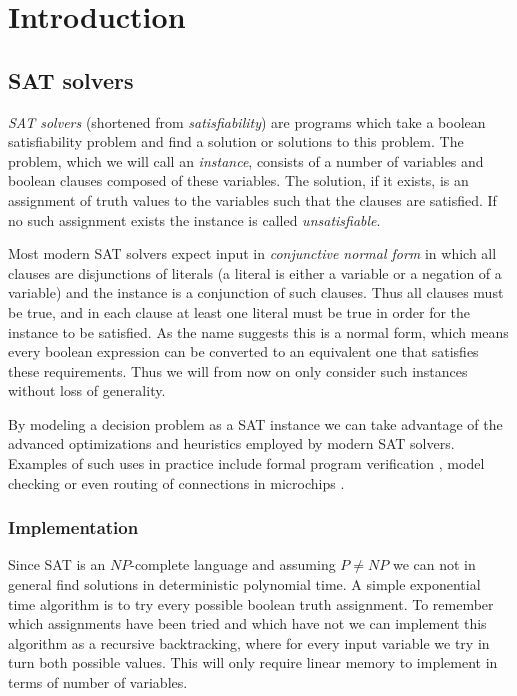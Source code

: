 \chapter{Introduction}
\section{SAT solvers}
\emph{SAT solvers} (shortened from \emph{satisfiability}) are programs which take a boolean satisfiability problem and find a solution or solutions to this problem.
The problem, which we will call an \emph{instance}, consists of a number of variables and boolean clauses composed of these variables.
The solution, if it exists, is an assignment of truth values to the variables such that the clauses are satisfied.
If no such assignment exists the instance is called \emph{unsatisfiable}.

Most modern SAT solvers expect input in \emph{conjunctive normal form} in which all clauses are disjunctions of literals (a literal is either a variable or a negation of a variable) and the instance is a conjunction of such clauses.
Thus all clauses must be true, and in each clause at least one literal must be true in order for the instance to be satisfied.
As the name suggests this is a normal form, which means every boolean expression can be converted to an equivalent one that satisfies these requirements.
Thus we will from now on only consider such instances without loss of generality.

By modeling a decision problem as a SAT instance we can take advantage of the advanced optimizations and heuristics employed by modern SAT solvers.
Examples of such uses in practice include formal program verification \cite{chaki2004modular, cook2005cogent}, model checking \cite{biere1999symbolic, mcmillan2002applying} or even routing of connections in microchips \cite{nam1999satisfiability, nam2004comparative}.

\subsection{Implementation}
Since SAT is an $NP$-complete language \cite{cook1971complexity} and assuming $P \neq NP$ we can not in general find solutions in deterministic polynomial time.
A simple exponential time algorithm is to try every possible boolean truth assignment.
To remember which assignments have been tried and which have not we can implement this algorithm as a recursive backtracking, where for every input variable we try in turn both possible values.
This will only require linear memory to implement in terms of number of variables.

